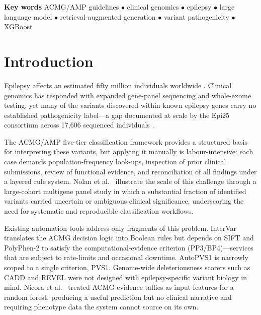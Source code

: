 \documentclass[12pt,a4paper]{article}
\begin{document}
\vspace{0.3cm}

\noindent\textbf{Key words}
ACMG/AMP guidelines $\bullet$
clinical genomics $\bullet$
epilepsy $\bullet$
large language model $\bullet$
retrieval-augmented generation $\bullet$
variant pathogenicity $\bullet$
XGBoost

\vspace{0.5cm}

\section{Introduction}

Epilepsy affects an estimated fifty million individuals worldwide
\cite{scheffer2017}. Clinical genomics has responded with expanded
gene-panel sequencing and whole-exome testing, yet many of the
variants discovered within known epilepsy genes carry no
established pathogenicity label---a gap documented at scale by the
Epi25 consortium across 17,606 sequenced individuals
\cite{epi25_2019}.

The ACMG/AMP five-tier classification framework \cite{richards2015}
provides a structured basis for interpreting these variants, but
applying it manually is labour-intensive: each case demands
population-frequency look-ups, inspection of prior clinical
submissions, review of functional evidence, and reconciliation of
all findings under a layered rule system. Nolan et al.\
\cite{nolan2022} illustrate the scale of this challenge through
a large-cohort multigene panel study in which a substantial
fraction of identified variants carried uncertain or ambiguous
clinical significance, underscoring the need for systematic and
reproducible classification workflows.

Existing automation tools address only fragments of this problem.
InterVar \cite{intervar2017} translates the ACMG decision logic
into Boolean rules but depends on SIFT and PolyPhen-2 to satisfy
the computational-evidence criterion (PP3/BP4)---services that are
subject to rate-limits and occasional downtime. AutoPVS1
\cite{autopvs1_2020} is narrowly scoped to a single criterion, PVS1.
Genome-wide deleteriousness scorers such as CADD \cite{cadd2014}
and REVEL \cite{revel2016} were not designed with epilepsy-specific
variant biology in mind. Nicora et al.\ \cite{nicora2022} treated
ACMG evidence tallies as input features for a random forest,
producing a useful prediction but no clinical narrative and
requiring phenotype data the system cannot source on its own.
\end{document}
